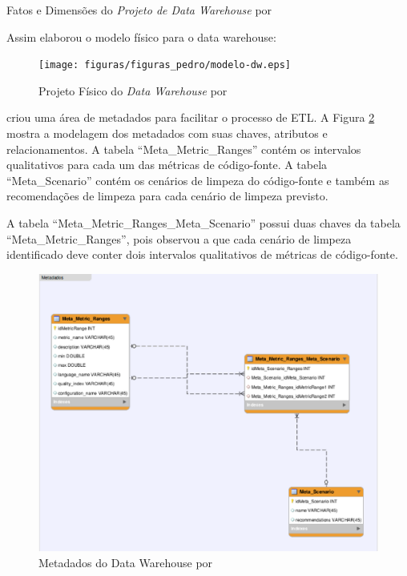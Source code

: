 \begin{table}[h]
\centering

\caption{Fatos e Dimensões do \textit{Projeto de Data Warehouse} por }
\label{tab:dimensoes-fato}
\end{table}
\FloatBarrier

Assim  elaborou o modelo físico para o data warehouse:

\begin{figure}[h!]
\centering
\texttt{[image: figuras/figuras\_pedro/modelo-dw.eps]}
\caption{Projeto Físico do \textit{Data Warehouse} por }
\label{fig:project-dw}
\end{figure}
\FloatBarrier


 criou uma área de metadados para facilitar o processo de ETL. A Figura \ref{fig:metadados} mostra a modelagem dos metadados com suas chaves, atributos e relacionamentos. A tabela ``Meta\_Metric\_Ranges'' contém os intervalos qualitativos para cada um das métricas de código-fonte. A tabela ``Meta\_Scenario'' contém os cenários de limpeza do código-fonte e também as recomendações de limpeza para cada cenário de limpeza previsto.

 A tabela  ``Meta\_Metric\_Ranges\_Meta\_Scenario'' possui duas chaves da tabela ``Meta\_Metric\_Ranges'', pois  observou a que cada cenário de limpeza identificado deve conter dois intervalos qualitativos de métricas de código-fonte.


\begin{figure}[h!]
\centering
\includegraphics[keepaspectratio=true,scale=0.65]{figuras/figuras_pedro/metadados.eps}
\caption{Metadados do Data Warehouse por }
\label{fig:metadados}
\end{figure}
\FloatBarrier

